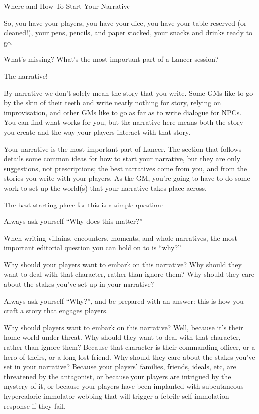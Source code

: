                           Where and How To Start Your Narrative  

So, you have your players, you have your dice, you have your table reserved (or cleaned!), your  
pens, pencils, and paper stocked, your snacks and drinks ready to go.
 

What’s missing? What’s the most important part of a Lancer session?
 

The narrative! 
 

                                                                                                               


By narrative we don’t solely mean the story that you write. Some GMs like to go by the skin of  
their teeth and write nearly nothing for story, relying on improvisation, and other GMs like to go  
as far as to write dialogue for NPCs. You can find what works for you, but the narrative here  
means both the story you create and the way your players interact with that story.
 

Your narrative is the most important part of Lancer. The section that follows details some  
common ideas for how to start your narrative, but they are only suggestions, not prescriptions;  
the best narratives come from you, and from the stories you write with your players. As the GM,  
you’re going to have to do some work to set up the world(s) that your narrative takes place  
across. 
 

The best starting place for this is a simple question:
 

Always ask yourself  “Why does this matter?”   

When writing villains, encounters, moments, and whole narratives, the most important editorial  
question you can hold on to is “why?”
 

Why should your players want to embark on this narrative? Why should they want to deal with  
that character, rather than ignore them? Why should they care about the stakes you’ve set up in  
your narrative? 
 

Always ask yourself “Why?”, and be prepared with an answer: this is how you craft a story that  
engages players.
 

Why should players want to embark on this narrative? Well, because it’s their home world under  
threat. Why should they want to deal with that character, rather than ignore them? Because that  
character is their commanding officer, or a hero of theirs, or a long-lost friend. Why should they  
care about the stakes you’ve set in your narrative? Because your players’ families, friends,  
ideals, etc, are threatened by the antagonist, or because your players are intrigued by the  
mystery of it, or because your players have been implanted with subcutaneous hypercaloric  
immolator webbing that will trigger a febrile self-immolation response if they fail. 
 

